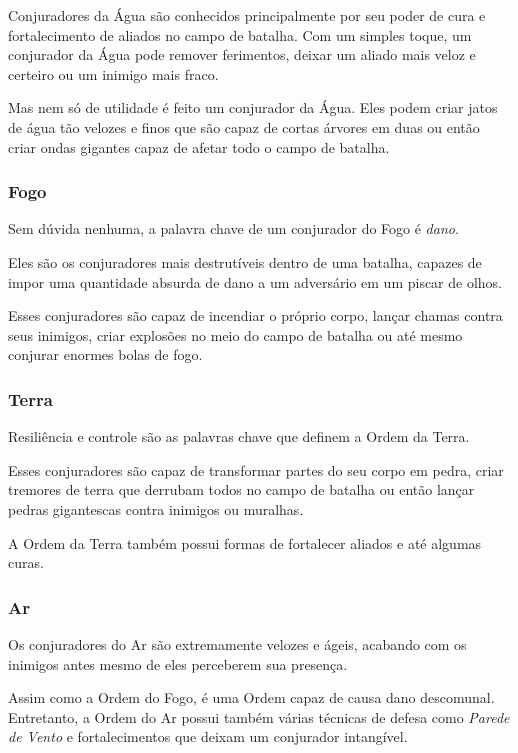 \begin{multicols}{2}
Conjuradores da Água são conhecidos principalmente por seu poder de cura e
fortalecimento de aliados no campo de batalha. Com um simples toque, um
conjurador da Água pode remover ferimentos, deixar um aliado mais veloz e
certeiro ou um inimigo mais fraco.

Mas nem só de utilidade é feito um conjurador da Água. Eles podem criar jatos de
água tão velozes e finos que são capaz de cortas árvores em duas ou então criar
ondas gigantes capaz de afetar todo o campo de batalha.

\subsubsection*{Fogo}%

Sem dúvida nenhuma, a palavra chave de um conjurador do Fogo é \textit{dano}.

Eles são os conjuradores mais destrutíveis dentro de uma batalha, capazes de
impor uma quantidade absurda de dano a um adversário em um piscar de olhos.

Esses conjuradores são capaz de incendiar o próprio corpo, lançar chamas contra
seus inimigos, criar explosões no meio do campo de batalha ou até mesmo conjurar
enormes bolas de fogo.

\subsubsection*{Terra}%

Resiliência e controle são as palavras chave que definem a Ordem da Terra.

Esses conjuradores são capaz de transformar partes do seu corpo em pedra, criar
tremores de terra que derrubam todos no campo de batalha ou então lançar pedras
gigantescas contra inimigos ou muralhas.

A Ordem da Terra também possui formas de fortalecer aliados e até algumas curas.

\subsubsection*{Ar}%

Os conjuradores do Ar são extremamente velozes e ágeis, acabando com os inimigos
antes mesmo de eles perceberem sua presença.

Assim como a Ordem do Fogo, é uma Ordem capaz de causa dano descomunal.
Entretanto, a Ordem do Ar possui também várias técnicas de defesa como
\textit{Parede de Vento} e fortalecimentos que deixam um conjurador intangível.


\end{multicols}
